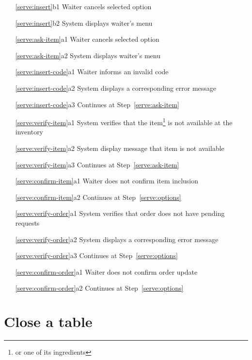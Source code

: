 \documentclass[a4paper,11pt,oneside]{book}
\newcommand{\cancel}[1]{#1 cancels selected option}
\newcommand{\menu}[1]{System displays #1's menu}
\newcommand{\goto}[1]{Continues at Step~\ref{#1}}
\begin{document}
\begin{enumerate}
  \item [\ref{serve:insert}b1] \cancel{Waiter}
  \item [\ref{serve:insert}b2] \menu{waiter}
    \\
  \item [\ref{serve:ask-item}a1] \cancel{Waiter}
  \item [\ref{serve:ask-item}a2] \menu{waiter}
    \\
  \item [\ref{serve:insert-code}a1] Waiter informs an invalid code
  \item [\ref{serve:insert-code}a2] System displays a corresponding error message
  \item [\ref{serve:insert-code}a3] \goto{serve:ask-item}
    \\
  \item [\ref{serve:verify-item}a1] System verifies that the item\footnote{or one of its ingredients} is not available at the inventory
  \item [\ref{serve:verify-item}a2] System display message that item is not available
  \item [\ref{serve:verify-item}a3] \goto{serve:ask-item}
    \\
  \item [\ref{serve:confirm-item}a1] Waiter does not confirm item inclusion
  \item [\ref{serve:confirm-item}a2] \goto{serve:options}
    \\
  \item [\ref{serve:verify-order}a1] System verifies that order does not have pending requests
  \item [\ref{serve:verify-order}a2] System displays a corresponding error message
  \item [\ref{serve:verify-order}a3] \goto{serve:options}
    \\
  \item [\ref{serve:confirm-order}a1] Waiter does not confirm order update
  \item [\ref{serve:confirm-order}a2] \goto{serve:options}
\end{enumerate}

\chapter{Close a table}
\end{document}
